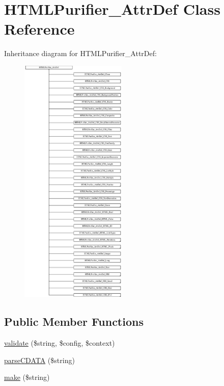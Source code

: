 \hypertarget{classHTMLPurifier__AttrDef}{\section{H\+T\+M\+L\+Purifier\+\_\+\+Attr\+Def Class Reference}
\label{classHTMLPurifier__AttrDef}
}
Inheritance diagram for H\+T\+M\+L\+Purifier\+\_\+\+Attr\+Def\+:\begin{figure}[H]
\begin{center}
\leavevmode
\includegraphics[height=12.000000cm]{classHTMLPurifier__AttrDef}
\end{center}
\end{figure}
\subsection*{Public Member Functions}
\begin{DoxyCompactItemize}
\item 
\hyperlink{classHTMLPurifier__AttrDef_ace1ff1a828cc98b27018cf894d1deca2}{validate} (\$string, \$config, \$context)
\item 
\hyperlink{classHTMLPurifier__AttrDef_a5260aa6ee70d13a454297a1d78ede45f}{parse\+C\+D\+A\+T\+A} (\$string)
\item 
\hyperlink{classHTMLPurifier__AttrDef_ac18259010bd7a7755cd4e1b47b54a549}{make} (\$string)
\end{DoxyCompactItemize}
